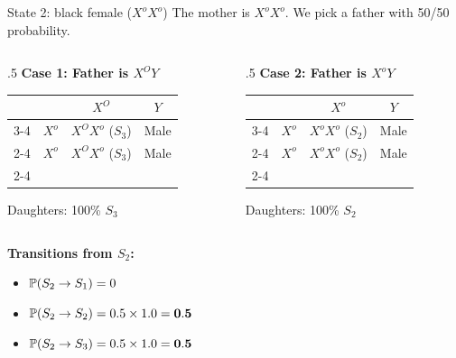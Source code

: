 \documentclass[aspectratio=169]{beamer}\usepackage[]{graphicx}\usepackage[]{xcolor}
\begin{document}
\begin{frame}{State 2: black female ($X^o X^o$)}
    The mother is $X^o X^o$. We pick a father with 50/50 probability.
    
    \begin{columns}[T]
        \begin{column}{.5\textwidth}
            \centering
            \textbf{Case 1: Father is $X^O Y$}
            \renewcommand{\arraystretch}{1.5}
            \begin{tabular}{c c | c | c |}
            \multicolumn{2}{c}{} & \multicolumn{1}{c}{$X^O$} & \multicolumn{1}{c}{$Y$} \\ \cline{3-4}
            \multirow{2}{*}{\rotatebox{90}{Mother}} & $X^o$ & \cellcolor{punnetttortie}$X^O X^o$ ($S_3$)& \cellcolor{punnettblack}Male \\ \cline{2-4}
            & $X^o$ & \cellcolor{punnetttortie}$X^O X^o$ ($S_3$)& \cellcolor{punnettblack}Male \\ \cline{2-4}
            \end{tabular}
            \vspace{1em}
            
            Daughters: 100\% $S_3$
        \end{column}
        \begin{column}{.5\textwidth}
            \centering
            \textbf{Case 2: Father is $X^o Y$}
            \renewcommand{\arraystretch}{1.5}
            \begin{tabular}{c c | c | c |}
            \multicolumn{2}{c}{} & \multicolumn{1}{c}{$X^o$} & \multicolumn{1}{c}{$Y$} \\ \cline{3-4}
            \multirow{2}{*}{\rotatebox{90}{Mother}} & $X^o$ & \cellcolor{punnettblack}$X^o X^o$ ($S_2$)& \cellcolor{punnettblack}Male \\ \cline{2-4}
            & $X^o$ & \cellcolor{punnettblack}$X^o X^o$ ($S_2$)& \cellcolor{punnettblack}Male \\ \cline{2-4}
            \end{tabular}
            \vspace{1em}
            
            Daughters: 100\% $S_2$
        \end{column}
    \end{columns}
    
    \vfill
    \textbf{Transitions from $S_2$:}
    \begin{itemize}
        \item $\mathbb{P}(S_2 \to S_1) = 0$
        \item $\mathbb{P}(S_2 \to S_2) = 0.5 \times 1.0 = \mathbf{0.5}$
        \item $\mathbb{P}(S_2 \to S_3) = 0.5 \times 1.0 = \mathbf{0.5}$
    \end{itemize}
\end{frame}
\end{document}
